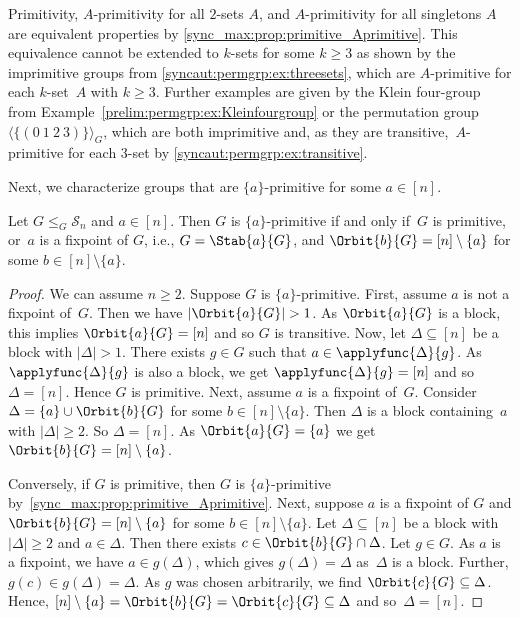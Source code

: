 Primitivity, $A$-primitivity for all $2$-sets $A$,
and $A$-primitivity for all singletons $A$ are equivalent properties
by \cref{sync_max:prop:primitive_Aprimitive}.
This equivalence cannot be extended to $k$-sets for some $k \ge 3$
as shown by the imprimitive groups from \cref{syncaut:permgrp:ex:threesets},
which are $A$-primitive for each $k$-set~$A$ with $k \ge 3$.
Further examples are given by the Klein four-group from Example~\ref{prelim:permgrp:ex:Kleinfourgroup}
or the permutation group $\langle \{ (0 ~ 1 ~ 2 ~ 3) \}\rangle_G$,
which are both imprimitive and, as they are transitive,~$A$-primitive for each $3$-set by \cref{syncaut:permgrp:ex:transitive}.

Next, we characterize groups that are $\{a\}$-primitive for some $a \in [n]$.

\begin{proposition}
	\label{prop:a-primitive}
	Let $G \le_G \mathcal S_n$ and $a \in [n]$.
	Then $G$ is $\{a\}$-primitive
	if and only if~$G$ is primitive,
	or~$a$ is a fixpoint of $G$, i.e., $G = \Stab{a}{G}$,
	and $\Orbit{b}{G} = [n] \setminus \{a\}$
	for some $b \in [n] \setminus \{a\}$.
\end{proposition}	
\begin{proof}
	We can assume $n \ge 2$.
	Suppose $G$ is $\{a\}$-primitive. 
	First, assume $a$ is not a fixpoint of~$G$.
	Then we have $|\Orbit{a}{G}| > 1$.
	As $\Orbit{a}{G}$
	is a block, this implies $\Orbit{a}{G} = [n]$
	and so $G$ is transitive.
	Now, let $\Delta \subseteq [n]$ be a block
	with $|\Delta| > 1$.
	There exists $g \in G$
	such that $a \in \applyfunc{\Delta}{g}$.
	As $\applyfunc{\Delta}{g}$ is also a block,
	we get $\applyfunc{\Delta}{g} = [n]$
	and so $\Delta = [n]$.
	Hence $G$ is primitive.
	Next, assume $a$ is a fixpoint of~$G$.
	Consider $\Delta = \{a\} \cup \Orbit{b}{G}$ for some $b \in [n] \setminus \{a\}$.	
	Then $\Delta$ is a block containing~$a$
	with $|\Delta| \ge 2$. So $\Delta = [n]$. 
	As $\Orbit{a}{G} = \{a\}$
	we get $\Orbit{b}{G} = [n] \setminus \{a\}$.
	
	Conversely, if $G$ is primitive,
	then $G$ is $\{a\}$-primitive by~\cref{sync_max:prop:primitive_Aprimitive}.
	Next, suppose $a$ is a fixpoint of $G$
	and $\Orbit{b}{G} = [n] \setminus \{a\}$
	for some $b \in [n] \setminus \{a\}$.
	Let $\Delta \subseteq [n]$ be a block with $|\Delta| \ge 2$
	and $a \in \Delta$.
	Then there exists $c \in \Orbit{b}{G} \cap \Delta$. Let $g \in G$.
	As $a$ is a fixpoint, we have $a \in g(\Delta)$, which
	gives $g(\Delta) = \Delta$ as~$\Delta$ is a block.
	Further, $g(c) \in g(\Delta) = \Delta$.
	As $g$ was chosen arbitrarily, we find $\Orbit{c}{G} \subseteq \Delta$.
	Hence, $[n] \setminus \{a\} = \Orbit{b}{G} = \Orbit{c}{G} \subseteq \Delta$
	and so~$\Delta = [n]$. 
\end{proof}

